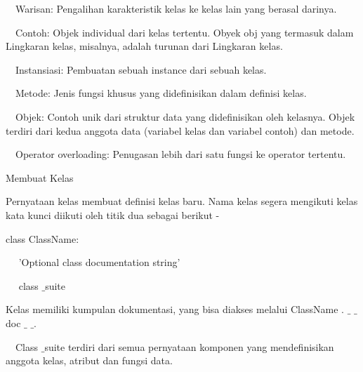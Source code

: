 \documentclass[a4paper,12pt]{report}
\begin{document}
\noindent 
\vspace{12pt}
\noindent 
 $  $ $  $ $  $ $  $Warisan: Pengalihan karakteristik kelas ke kelas lain yang berasal darinya. \par
\noindent 
\vspace{12pt}
\noindent 
 $  $ $  $ $  $ $  $Contoh: Objek individual dari kelas tertentu. Obyek obj yang termasuk dalam Lingkaran kelas, misalnya, adalah turunan dari Lingkaran kelas. \par
\noindent 
\vspace{12pt}
\noindent 
 $  $ $  $ $  $ $  $Instansiasi: Pembuatan sebuah instance dari sebuah kelas. \par
\noindent 
\vspace{12pt}
\noindent 
 $  $ $  $ $  $ $  $Metode: Jenis fungsi khusus yang didefinisikan dalam definisi kelas. \par
\noindent 
\vspace{12pt}
\noindent 
 $  $ $  $ $  $ $  $Objek: Contoh unik dari struktur data yang didefinisikan oleh kelasnya. Objek terdiri dari kedua anggota data (variabel kelas dan variabel contoh) dan metode. \par
\noindent 
\vspace{12pt}
\noindent 
 $  $ $  $ $  $ $  $Operator overloading: Penugasan lebih dari satu fungsi ke operator tertentu. \par
\noindent 
\vspace{12pt}
\noindent 
Membuat Kelas \par
\noindent 
\vspace{12pt}
\noindent 
Pernyataan kelas membuat definisi kelas baru. Nama kelas segera mengikuti kelas kata kunci diikuti oleh titik dua sebagai berikut - \par
\vspace{12pt}
\vspace{12pt}
\noindent 
class ClassName: \par
\noindent 
~~ 'Optional class documentation string' \par
\noindent 
~~ class $  \_  $suite \par
\vspace{12pt}
\vspace{12pt}
\noindent 
Kelas memiliki kumpulan dokumentasi, yang bisa diakses melalui ClassName . $  \_  $ $  \_  $ doc $  \_  $ $  \_  $. \par
\vspace{12pt}
\noindent 
 $  $ $  $ $  $ $  $Class $  \_  $suite terdiri dari semua pernyataan komponen yang mendefinisikan anggota kelas, atribut dan fungsi data. \par
\end{document}
